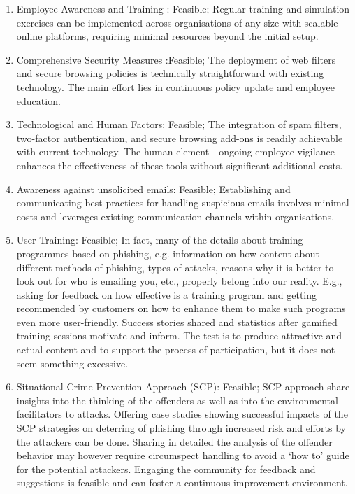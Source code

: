 \begin{enumerate}
    \item Employee Awareness and Training : Feasible; Regular training and simulation exercises can be implemented across organisations of any size with scalable online platforms, requiring minimal resources beyond the initial setup.
    \item Comprehensive Security Measures :Feasible; The deployment of web filters and secure browsing policies is technically straightforward with existing technology. The main effort lies in continuous policy update and employee education.
    \item Technological and Human Factors: Feasible; The integration of spam filters, two-factor authentication, and secure browsing add-ons is readily achievable with current technology. The human element—ongoing employee vigilance—enhances the effectiveness of these tools without significant additional costs.
    \item Awareness against unsolicited emails: Feasible; Establishing and communicating best practices for handling suspicious emails involves minimal costs and leverages existing communication channels within organisations.

     \item User Training: Feasible; In fact, many of the details about training programmes based on phishing, e.g. information on how content about different methods of phishing, types of attacks, reasons why it is better to look out for who is emailing you, etc., properly belong into our reality. E.g., asking for feedback on how effective is a training program and getting recommended by customers on how to enhance them to make such programs even more user-friendly. Success stories shared and statistics after gamified training sessions motivate and inform. The test is to produce attractive and actual content and to support the process of participation, but it does not seem something excessive.
     
     \item Situational Crime Prevention Approach (SCP): Feasible;  SCP approach share insights into the thinking of the offenders as well as into the environmental facilitators to attacks. Offering case studies showing successful impacts of the SCP strategies on deterring of phishing through increased risk and efforts by the attackers can be done. Sharing in detailed the analysis of the offender behavior may however require circumspect handling to avoid a ‘how to’ guide for the potential attackers. Engaging the community for feedback and suggestions is feasible and can foster a continuous improvement environment.
     

\end{enumerate}
